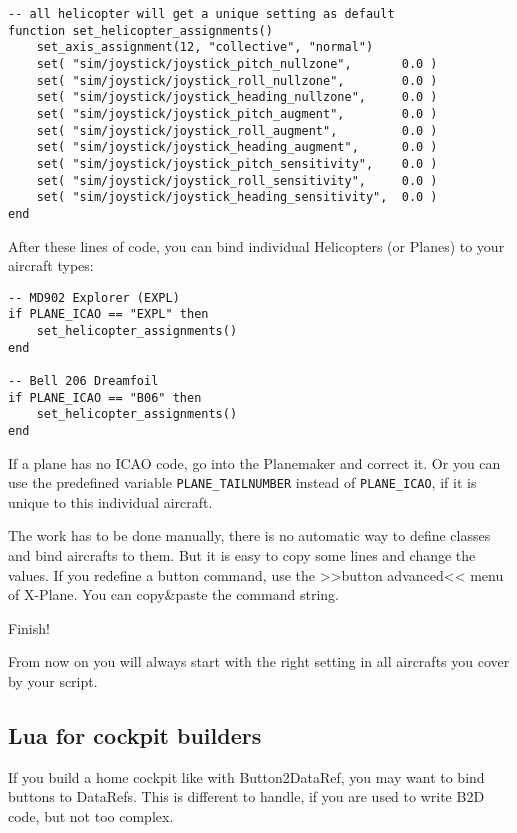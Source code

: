 \documentclass[11pt,parskip=half,a4paper]{scrartcl}
\begin{document}
\begin{lstlisting}[firstnumber=134]
-- all helicopter will get a unique setting as default
function set_helicopter_assignments()
    set_axis_assignment(12, "collective", "normal")
    set( "sim/joystick/joystick_pitch_nullzone",       0.0 )
    set( "sim/joystick/joystick_roll_nullzone",        0.0 )
    set( "sim/joystick/joystick_heading_nullzone",     0.0 )
    set( "sim/joystick/joystick_pitch_augment",        0.0 )
    set( "sim/joystick/joystick_roll_augment",         0.0 )
    set( "sim/joystick/joystick_heading_augment",      0.0 )
    set( "sim/joystick/joystick_pitch_sensitivity",    0.0 )
    set( "sim/joystick/joystick_roll_sensitivity",     0.0 )
    set( "sim/joystick/joystick_heading_sensitivity",  0.0 )
end
\end{lstlisting}

After these lines of code, you can bind individual Helicopters (or Planes) to your aircraft types:

\begin{lstlisting}[firstnumber=156]
-- MD902 Explorer (EXPL)
if PLANE_ICAO == "EXPL" then
    set_helicopter_assignments()
end

-- Bell 206 Dreamfoil
if PLANE_ICAO == "B06" then
    set_helicopter_assignments()
end
\end{lstlisting}

If a plane has no ICAO code, go into the Planemaker and correct it. Or you can use the predefined variable \verb|PLANE_TAILNUMBER| instead of \verb|PLANE_ICAO|, if it is unique to this individual aircraft.

The work has to be done manually, there is no automatic way to define classes and bind aircrafts to them. But it is easy to copy some lines and change the values. If you redefine a button command, use the >>button advanced<< menu of X-Plane. You can copy\&paste the command string.

Finish!

From now on you will always start with the right setting in all aircrafts you cover by your script.

\subsection{Lua for cockpit builders}

If you build a home cockpit like with Button2DataRef, you may want to bind buttons to DataRefs. This is different to handle, if you are used to write B2D code, but not too complex.
\end{document}

